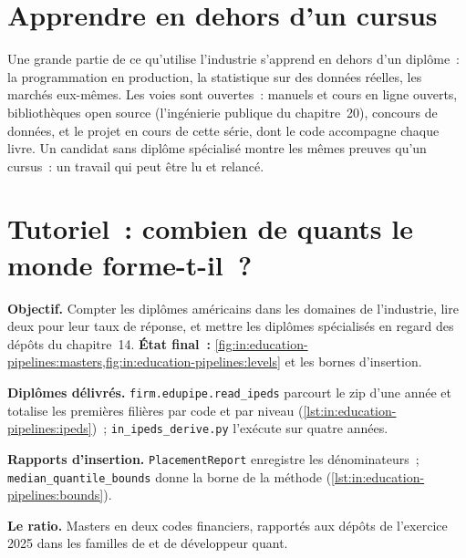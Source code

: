 \section{Apprendre en dehors d'un cursus}

Une grande partie de ce qu'utilise l'industrie s'apprend en dehors d'un diplôme~: la programmation en production, la statistique sur des données réelles, les
marchés eux-mêmes. Les voies sont ouvertes~: manuels et cours en ligne ouverts, bibliothèques open source (l'ingénierie publique du chapitre~20), concours
de données, et le projet en cours de cette série, dont le code accompagne chaque livre. Un candidat
sans diplôme spécialisé montre les mêmes preuves qu'un cursus~: un travail qui peut être lu et relancé.

\section{Tutoriel~: combien de quants le monde forme-t-il~?}\label{tut:in:education-pipelines:tut}

\begin{tutorial}
\textbf{Objectif.} Compter les diplômes américains dans les domaines de l'industrie, lire deux  pour leur taux de réponse, et mettre
les diplômes spécialisés en regard des dépôts du chapitre~14.
\textbf{État final~:} \cref{fig:in:education-pipelines:masters,fig:in:education-pipelines:levels} et les bornes d'insertion.
\begin{tutsteps}
\item \textbf{Diplômes délivrés.} \texttt{firm.edupipe.read\_ipeds} parcourt le zip d'une année et totalise les premières filières par code
et par niveau (\cref{lst:in:education-pipelines:ipeds})~; \texttt{in\_ipeds\_derive.py} l'exécute sur quatre années.
\label{lst:in:education-pipelines:ipeds}
\item \textbf{Rapports d'insertion.} \texttt{PlacementReport} enregistre les dénominateurs~; \texttt{median\_quantile\_bounds} donne
la borne de la méthode (\cref{lst:in:education-pipelines:bounds}).
\label{lst:in:education-pipelines:bounds}
\item \textbf{Le ratio.} Masters en deux codes financiers, rapportés aux dépôts de l'exercice 2025 dans les familles
de  et de développeur quant.
\end{tutsteps}
\end{tutorial}

